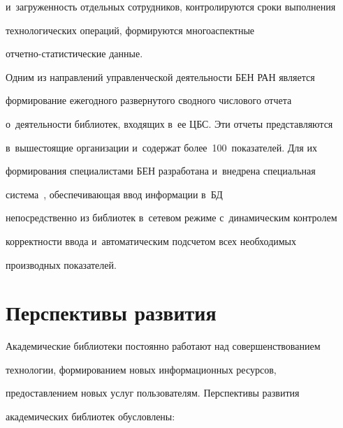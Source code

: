 и~загруженность отдельных сотрудников, контролируются сроки выполнения 


технологических операций, формируются многоаспектные  


от\-чет\-но-ста\-ти\-сти\-че\-ские данные. 


  


  Одним из направлений управленческой деятельности БЕН РАН является 


формирование ежегодного развернутого сводного числового отчета 


о~де\-ятель\-ности библиотек, входящих в~ее ЦБС. Эти отчеты представляются 


в~вышестоящие организации и~содержат более~100~показателей. Для их 


формирования специалистами БЕН разработана и~внедрена специальная 


система~\cite{24-vla}, обеспечивающая ввод информации в~БД 


непосредственно из библиотек в~сетевом режиме с~динамическим контролем 


корректности ввода и~автоматическим подсчетом всех необходимых 


производных показателей. 


  


\section{Перспективы развития}





  Академические библиотеки постоянно работают над совершенствованием 


технологии, формированием новых информационных ресурсов, 


предоставлением новых услуг пользователям. Перспективы развития 


академических библиотек обусловлены: 


